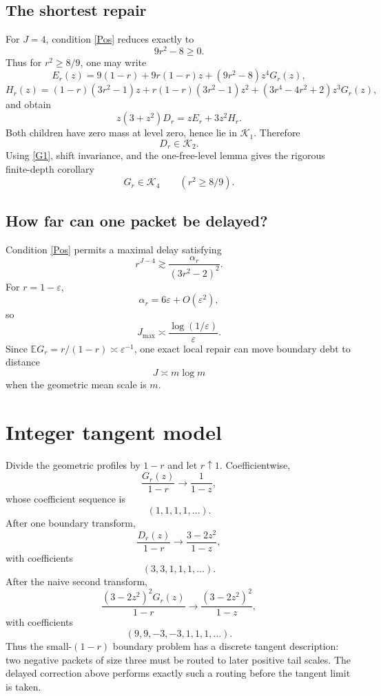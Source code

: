 \documentclass[11pt,a4paper]{article}
\newcommand{\E}{\mathbb E}
\newcommand{\cK}{\mathcal K}
\newcommand{\1}{\mathbf 1}
\begin{document}
\subsection{The shortest repair}

For \(J=4\), condition \eqref{Pos} reduces exactly to
\[
9r^2-8\ge0.
\]
Thus for \(r^2\ge8/9\), one may write
\[
E_r(z)
=
9(1-r)+9r(1-r)z+(9r^2-8)z^4G_r(z),
\]
\[
H_r(z)
=
(1-r)(3r^2-1)z
+r(1-r)(3r^2-1)z^2
+(3r^4-4r^2+2)z^3G_r(z),
\]
and obtain
\[
z(3+z^2)D_r=zE_r+3z^2H_r.
\]
Both children have zero mass at level zero, hence lie in \(\cK_1\).  Therefore
\[
\boxed{D_r\in\cK_2.}
\]
Using \eqref{G1}, shift invariance, and the one-free-level lemma gives the
rigorous finite-depth corollary
\[
\boxed{G_r\in\cK_4\qquad(r^2\ge8/9).}
\]

\subsection{How far can one packet be delayed?}

Condition \eqref{Pos} permits a maximal delay satisfying
\[
r^{J-4}
\gtrsim
\frac{\alpha_r}{(3r^2-2)^2}.
\]
For \(r=1-\varepsilon\),
\[
\alpha_r=6\varepsilon+O(\varepsilon^2),
\]
so
\[
\boxed{
J_{\max}
\asymp
\frac{\log(1/\varepsilon)}{\varepsilon}.
}
\]
Since \(\E G_r=r/(1-r)\asymp\varepsilon^{-1}\), one exact local repair can
move boundary debt to distance
\[
J\asymp m\log m
\]
when the geometric mean scale is \(m\).

\section{Integer tangent model}

Divide the geometric profiles by \(1-r\) and let \(r\uparrow1\).  Coefficientwise,
\[
\frac{G_r(z)}{1-r}
\longrightarrow
\frac1{1-z},
\]
whose coefficient sequence is
\[
(1,1,1,1,\ldots).
\]
After one boundary transform,
\[
\frac{D_r(z)}{1-r}
\longrightarrow
\frac{3-2z^2}{1-z},
\]
with coefficients
\[
(3,3,1,1,1,\ldots).
\]
After the naive second transform,
\[
\frac{(3-2z^2)^2G_r(z)}{1-r}
\longrightarrow
\frac{(3-2z^2)^2}{1-z},
\]
with coefficients
\[
\boxed{
(9,9,-3,-3,1,1,1,\ldots).
}
\]
Thus the small-\((1-r)\) boundary problem has a discrete tangent description:
two negative packets of size three must be routed to later positive tail scales.
The delayed correction above performs exactly such a routing before the tangent
limit is taken.
\end{document}

